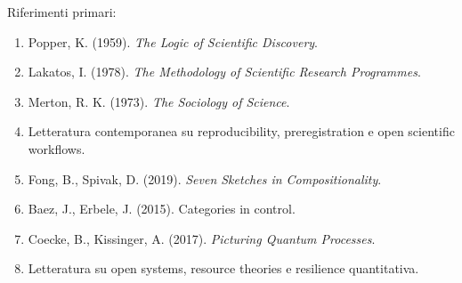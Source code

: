 Riferimenti primari:

\begin{enumerate}
\def\labelenumi{\arabic{enumi}.}
\tightlist
\item
  Popper, K. (1959). \emph{The Logic of Scientific Discovery}.
\item
  Lakatos, I. (1978). \emph{The Methodology of Scientific Research Programmes}.
\item
  Merton, R. K. (1973). \emph{The Sociology of Science}.
\item
  Letteratura contemporanea su reproducibility, preregistration e open scientific workflows.
\item
  Fong, B., Spivak, D. (2019). \emph{Seven Sketches in Compositionality}.
\item
  Baez, J., Erbele, J. (2015). Categories in control.
\item
  Coecke, B., Kissinger, A. (2017). \emph{Picturing Quantum Processes}.
\item
  Letteratura su open systems, resource theories e resilience quantitativa.
\end{enumerate}

